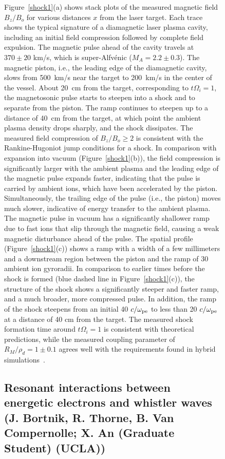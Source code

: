 \documentclass[11pt]{article}
\renewcommand{\cite}{\citep}
\begin{document}
\begin{description}
\begin{figure}[!htbp]
Figure~\ref{shock1}(a) shows stack plots of the measured magnetic field
$B_z/B_o$ for various
distances $x$ from the laser target. Each trace shows the typical
signature of a diamagnetic laser plasma cavity, including an initial
field compression followed by complete field expulsion. The magnetic
pulse ahead of the cavity travels at $370 \pm 20$ km/s, which is
super-Alfvénic ($M_A = 2.2 \pm 0.3$). The magnetic
piston, i.e., the leading edge of the diamagnetic cavity, slows from
500~km/s near the target to 200~km/s in the center of the vessel. About 20~cm from the target, corresponding to
$t \Omega_{i} =1$, the magnetosonic pulse starts to
steepen into a shock and to separate from the piston. The ramp continues
to steepen up to a distance of 40~cm from the target, at which point the
ambient plasma density drops sharply, and the shock dissipates. The
measured field compression of $B_z/B_o \ge 2$ is consistent
with the Rankine-Hugoniot jump conditions for a shock. In comparison
with expansion into vacuum (Figure~\ref{shock1}(b)), the field compression is
significantly larger with the ambient plasma and the leading edge of the
magnetic pulse expands faster, indicating that the pulse is carried by
ambient ions, which have been accelerated by the piston. Simultaneously,
the trailing edge of the pulse (i.e., the piston) moves much slower,
indicative of energy transfer to the ambient plasma. The magnetic pulse
in vacuum has a significantly shallower ramp due to fast ions that slip
through the magnetic field, causing a weak magnetic disturbance ahead of
the pulse. The spatial profile (Figure~\ref{shock1}(c)) shows a ramp with a width of
a few millimeters and a downstream region between the piston and the
ramp of 30 ambient ion gyroradii. In comparison to earlier times before
the shock is formed (blue dashed line in Figure~\ref{shock1}(c)), the structure of
the shock shows a significantly steeper and faster ramp, and a much
broader, more compressed pulse. In addition, the ramp of the shock
steepens from an initial 40 $c/\omega_{\rm pe}$ to less
than 20 $c/\omega_{\rm pe}$ at a distance of 40 cm from
the target. The measured shock formation time around
$t \Omega_{i} = 1$ is consistent with theoretical
predictions, while the measured coupling parameter of
$R_M/\rho_d = 1 \pm 0.1$ agrees
well with the requirements found in hybrid simulations~\cite{clark:2014}.


\subsection{Resonant interactions between energetic electrons and whistler
waves (J. Bortnik, R. Thorne, B. Van Compernolle; X. An (Graduate
Student) (UCLA))}


\end{figure}
\end{description}
\end{document}
